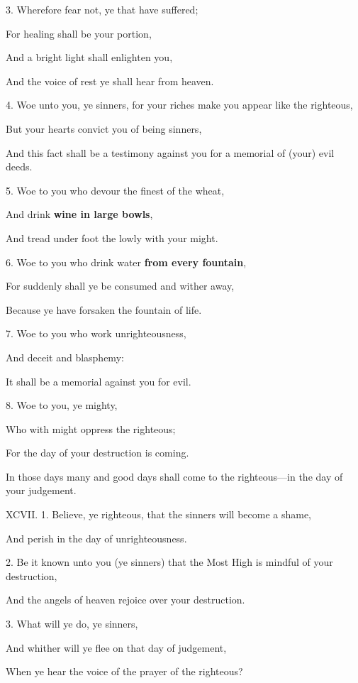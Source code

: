 3. Wherefore fear not, ye that have suffered;

For healing shall be your portion,

And a bright light shall enlighten you,

And the voice of rest ye shall hear from heaven.

4. Woe unto you, ye sinners, for your riches make you appear like the righteous,

But your hearts convict you of being sinners,

And this fact shall be a testimony against you for a memorial of (your) evil deeds.

5. Woe to you who devour the finest of the wheat,

And drink \textbf{wine in large bowls},

And tread under foot the lowly with your might.

6. Woe to you who drink water \textbf{from every fountain},

For suddenly shall ye be consumed and wither away,

Because ye have forsaken the fountain of life.

7. Woe to you who work unrighteousness,

And deceit and blasphemy:

It shall be a memorial against you for evil.

8. Woe to you, ye mighty,

Who with might oppress the righteous;

For the day of your destruction is coming.

In those days many and good days shall come to the righteous—in the day of your judgement.


XCVII. 1. Believe, ye righteous, that the sinners will become a shame,

And perish in the day of unrighteousness.

2. Be it known unto you (ye sinners) that the Most High is mindful of your destruction,

And the angels of heaven rejoice over your destruction.

3. What will ye do, ye sinners,

And whither will ye flee on that day of judgement,

When ye hear the voice of the prayer of the righteous?

